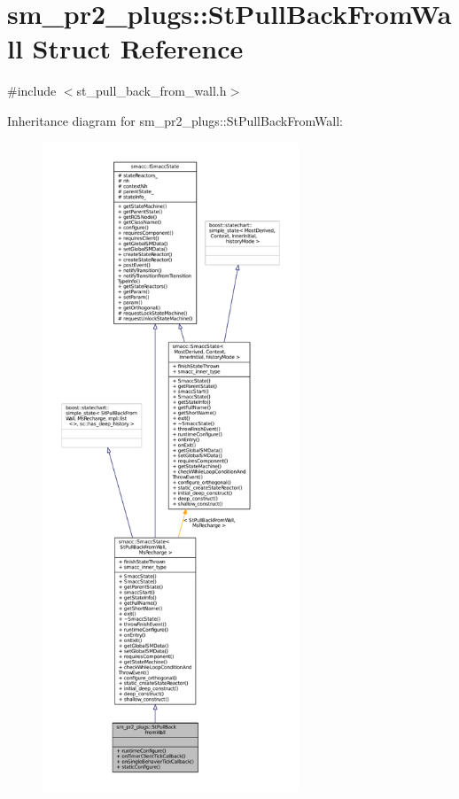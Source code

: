 \hypertarget{structsm__pr2__plugs_1_1StPullBackFromWall}{}\section{sm\+\_\+pr2\+\_\+plugs\+:\+:St\+Pull\+Back\+From\+Wall Struct Reference}
\label{structsm__pr2__plugs_1_1StPullBackFromWall}


{\ttfamily \#include $<$st\+\_\+pull\+\_\+back\+\_\+from\+\_\+wall.\+h$>$}



Inheritance diagram for sm\+\_\+pr2\+\_\+plugs\+:\+:St\+Pull\+Back\+From\+Wall\+:
\nopagebreak
\begin{figure}[H]
\begin{center}
\leavevmode
\includegraphics[height=550pt]{structsm__pr2__plugs_1_1StPullBackFromWall__inherit__graph}
\end{center}
\end{figure}


